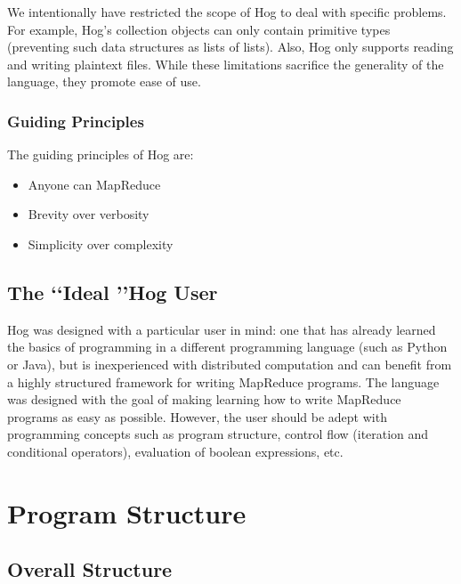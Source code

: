 \documentclass{article}
\begin{document}
We intentionally have restricted the scope of Hog to deal with specific problems. For example, Hog's collection objects can
only contain primitive types (preventing such data structures as lists of lists). Also, Hog only supports reading and writing
plaintext files. While these limitations sacrifice the generality of the language, they promote ease of use.

\subsubsection{Guiding Principles} %
\label{ssub:guiding_principles}

The guiding principles of Hog are:

\begin{itemize}
  \item Anyone can MapReduce
  \item Brevity over verbosity
  \item Simplicity over complexity
\end{itemize}



\subsection{The \lq\lq Ideal \rq\rq Hog User} %
\label{sub:the_ideal_hog_user}

Hog was designed with a particular user in mind: one that has already learned the basics of programming in a different
programming language (such as Python or Java), but is inexperienced with distributed computation and can benefit from a highly structured framework for writing MapReduce programs. The language was designed with the goal of making learning how to write MapReduce programs as easy as possible. However, the user should be adept with programming concepts such as program structure, control flow (iteration and conditional operators), evaluation of boolean expressions, etc.


\section{Program Structure} %
\label{sec:program_structure}

\subsection{Overall Structure} %
\label{sub:overall_structure}
\end{document}
